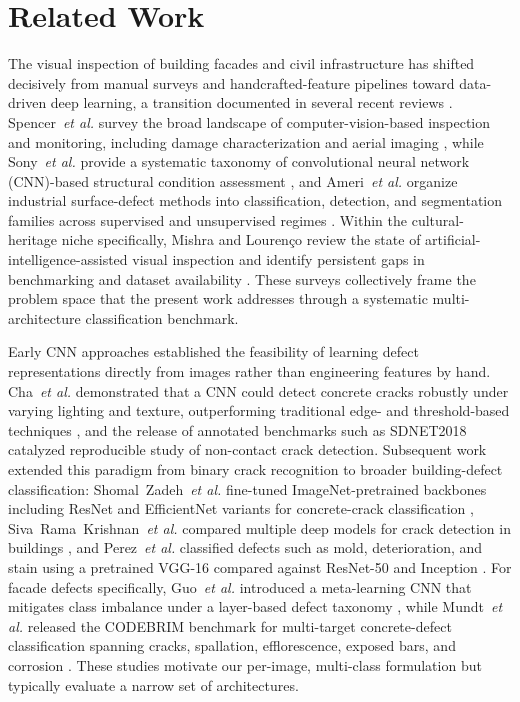 \documentclass[conference]{IEEEtran}
\begin{document}
\section{Related Work}

The visual inspection of building facades and civil infrastructure has shifted decisively from manual surveys and handcrafted-feature pipelines toward data-driven deep learning, a transition documented in several recent reviews \cite{ref1,ref2,ref3,ref4}. Spencer~\textit{et al.} survey the broad landscape of computer-vision-based inspection and monitoring, including damage characterization and aerial imaging \cite{ref2}, while Sony~\textit{et al.} provide a systematic taxonomy of convolutional neural network (CNN)-based structural condition assessment \cite{ref3}, and Ameri~\textit{et al.} organize industrial surface-defect methods into classification, detection, and segmentation families across supervised and unsupervised regimes \cite{ref4}. Within the cultural-heritage niche specifically, Mishra and Lourenço review the state of artificial-intelligence-assisted visual inspection and identify persistent gaps in benchmarking and dataset availability \cite{ref1}. These surveys collectively frame the problem space that the present work addresses through a systematic multi-architecture classification benchmark.

Early CNN approaches established the feasibility of learning defect representations directly from images rather than engineering features by hand. Cha~\textit{et al.} demonstrated that a CNN could detect concrete cracks robustly under varying lighting and texture, outperforming traditional edge- and threshold-based techniques \cite{ref5}, and the release of annotated benchmarks such as SDNET2018 \cite{ref6} catalyzed reproducible study of non-contact crack detection. Subsequent work extended this paradigm from binary crack recognition to broader building-defect classification: Shomal~Zadeh~\textit{et al.} fine-tuned ImageNet-pretrained backbones including ResNet and EfficientNet variants for concrete-crack classification \cite{ref7}, Siva~Rama~Krishnan~\textit{et al.} compared multiple deep models for crack detection in buildings \cite{ref8}, and Perez~\textit{et al.} classified defects such as mold, deterioration, and stain using a pretrained VGG-16 compared against ResNet-50 and Inception \cite{ref9}. For facade defects specifically, Guo~\textit{et al.} introduced a meta-learning CNN that mitigates class imbalance under a layer-based defect taxonomy \cite{ref10}, while Mundt~\textit{et al.} released the CODEBRIM benchmark for multi-target concrete-defect classification spanning cracks, spallation, efflorescence, exposed bars, and corrosion \cite{ref11}. These studies motivate our per-image, multi-class formulation but typically evaluate a narrow set of architectures.
\end{document}
